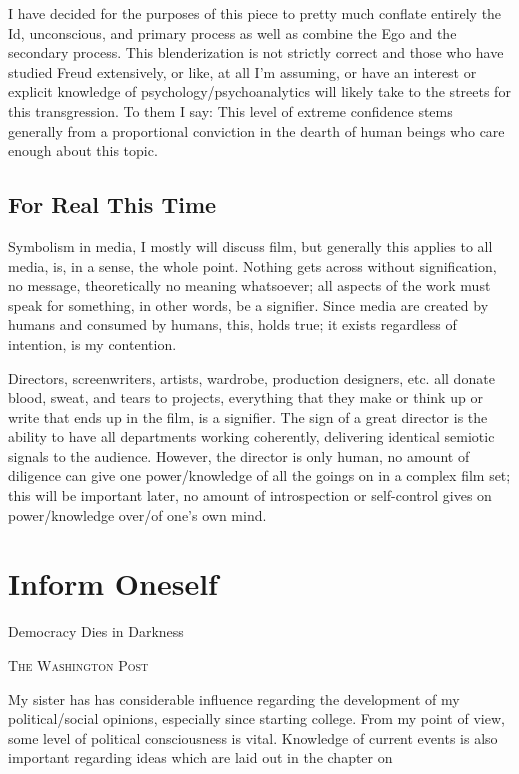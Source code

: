 \documentclass[../butidigress.tex]{subfiles}
\begin{document}
I have decided for the purposes of this piece to pretty much conflate entirely the Id, unconscious, and primary process as well as combine the Ego and the secondary process.
This blenderization is not strictly correct and those who have studied Freud extensively, or like, at all I'm assuming, or have an interest or explicit knowledge of psychology/psychoanalytics will likely take to the streets for this transgression.
To them I say: 
This level of extreme confidence stems generally from a proportional conviction in the dearth of human beings who care enough about this topic.

\subsection{For Real This Time}
Symbolism in media, I mostly will discuss film, but generally this applies to all media, is, in a sense, the whole point.
Nothing gets across without signification, no message, theoretically no meaning whatsoever; all aspects of the work must speak for something, in other words, be a signifier.
Since media are created by humans and consumed by humans, this,  holds true; it exists regardless of intention, is my contention.

Directors, screenwriters, artists, wardrobe, production designers, etc. all donate blood, sweat, and tears to projects, everything that they make or think up or write that ends up in the film, is a signifier.
The sign of a great director is the ability to have all departments working coherently, delivering identical semiotic signals to the audience.
However, the director is only human, no amount of diligence can give one power/knowledge of all the goings on in a complex film set; this will be important later, no amount of introspection or self-control gives on power/knowledge over/of one's own mind.

\section{Inform Oneself}
\epigraph{Democracy Dies in Darkness}{\textsc{The Washington Post}}
My sister has has considerable influence regarding the development of my political/social opinions, especially since starting college.
From my point of view, some level of political consciousness is vital.
Knowledge of current events is also important regarding ideas which are laid out in the chapter on 
\end{document}
